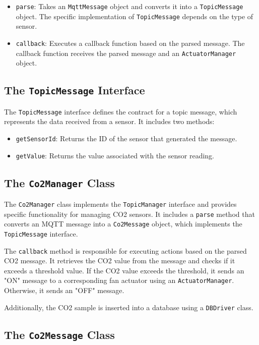 \documentclass[parskip=full]{report}
\begin{document}
	\begin{itemize}
		\item \texttt{parse}: Takes an \texttt{MqttMessage} object and converts it into a \texttt{TopicMessage} object. The specific implementation of \texttt{TopicMessage} depends on the type of sensor.
		\item \texttt{callback}: Executes a callback function based on the parsed message. The callback function receives the parsed message and an \texttt{ActuatorManager} object.
	\end{itemize}
	
	\subsection{The \texttt{TopicMessage} Interface}
	
	The \texttt{TopicMessage} interface defines the contract for a topic message, which represents the data received from a sensor. It includes two methods:
	
	\begin{itemize}
		\item \texttt{getSensorId}: Returns the ID of the sensor that generated the message.
		\item \texttt{getValue}: Returns the value associated with the sensor reading.
	\end{itemize}
	
	\subsection{The \texttt{Co2Manager} Class}
	
	The \texttt{Co2Manager} class implements the \texttt{TopicManager} interface and provides specific functionality for managing CO2 sensors. It includes a \texttt{parse} method that converts an MQTT message into a \texttt{Co2Message} object, which implements the \texttt{TopicMessage} interface.
	
	The \texttt{callback} method is responsible for executing actions based on the parsed CO2 message. It retrieves the CO2 value from the message and checks if it exceeds a threshold value. If the CO2 value exceeds the threshold, it sends an "ON" message to a corresponding fan actuator using an \texttt{ActuatorManager}. Otherwise, it sends an "OFF" message.
	
	Additionally, the CO2 sample is inserted into a database using a \texttt{DBDriver} class.
	
	\subsection{The \texttt{Co2Message} Class}
	
\end{document}
